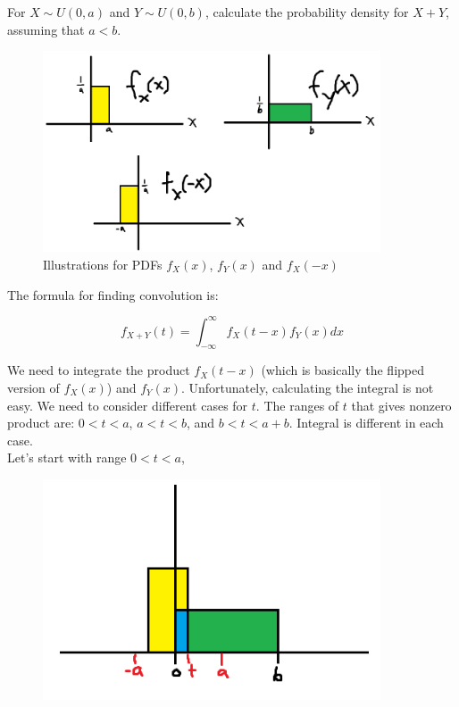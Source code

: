 \documentclass[12pt, a4paper]{article}
\newcounter{exa}
\begin{document}
\begin{texample}
For $X\sim U(0,a)$ and $Y\sim U(0,b)$, calculate the probability density for $X+Y$, assuming that $a<b$. \\

\begin{figure}[H]
\centering
\includegraphics[width=100mm]{24.png}
\caption{Illustrations for PDFs $f_X(x)$, $f_Y(x)$ and $f_X(-x)$}
\end{figure}

The formula for finding convolution is:

\[ f_{X+Y}(t)=\int_{-\infty}^\infty f_X(t-x) f_Y(x) dx \]

We need to integrate the product $f_X(t-x)$ (which is basically the flipped version of $f_X(x)$) and $f_Y(x)$. Unfortunately, calculating the integral is not easy. We need to consider different cases for $t$. The ranges of $t$ that gives nonzero product are: $0<t<a$, $a<t<b$, and $b<t<a+b$. Integral is different in each case. \\

Let's start with range $0<t<a$,

\begin{figure}[H]
\centering
\includegraphics[width=100mm]{25.png}
\end{figure}


\end{texample}
\end{document}
